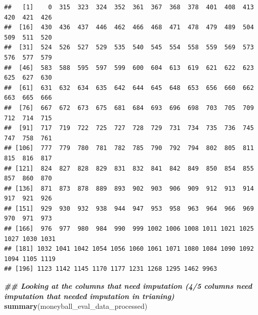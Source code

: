\documentclass[
]{article}
\newenvironment{Shaded}{\begin{snugshade}}{\end{snugshade}}
\newcommand{\DocumentationTok}[1]{\textcolor[rgb]{0.56,0.35,0.01}{\textbf{\textit{#1}}}}
\newcommand{\FunctionTok}[1]{\textcolor[rgb]{0.13,0.29,0.53}{\textbf{#1}}}
\newcommand{\NormalTok}[1]{#1}
\begin{document}
\begin{verbatim}
##   [1]    0  315  323  324  352  361  367  368  378  401  408  413  420  421  426
##  [16]  430  436  437  446  462  466  468  471  478  479  489  504  509  511  520
##  [31]  524  526  527  529  535  540  545  554  558  559  569  573  576  577  579
##  [46]  583  588  595  597  599  600  604  613  619  621  622  623  625  627  630
##  [61]  631  632  634  635  642  644  645  648  653  656  660  662  663  665  666
##  [76]  667  672  673  675  681  684  693  696  698  703  705  709  712  714  715
##  [91]  717  719  722  725  727  728  729  731  734  735  736  745  747  758  761
## [106]  777  779  780  781  782  785  790  792  794  802  805  811  815  816  817
## [121]  824  827  828  829  831  832  841  842  849  850  854  855  857  860  870
## [136]  871  873  878  889  893  902  903  906  909  912  913  914  917  921  926
## [151]  929  930  932  938  944  947  953  958  963  964  966  969  970  971  973
## [166]  976  977  980  984  990  999 1002 1006 1008 1011 1021 1025 1027 1030 1031
## [181] 1032 1041 1042 1054 1056 1060 1061 1071 1080 1084 1090 1092 1094 1105 1119
## [196] 1123 1142 1145 1170 1177 1231 1268 1295 1462 9963
\end{verbatim}

\begin{Shaded}
\begin{Highlighting}[]
\DocumentationTok{\#\# Looking at the columns that need imputation (4/5 columns need imputation that needed imputation in trianing)}
\FunctionTok{summary}\NormalTok{(moneyball\_eval\_data\_processed)}
\end{Highlighting}
\end{Shaded}
\end{document}

